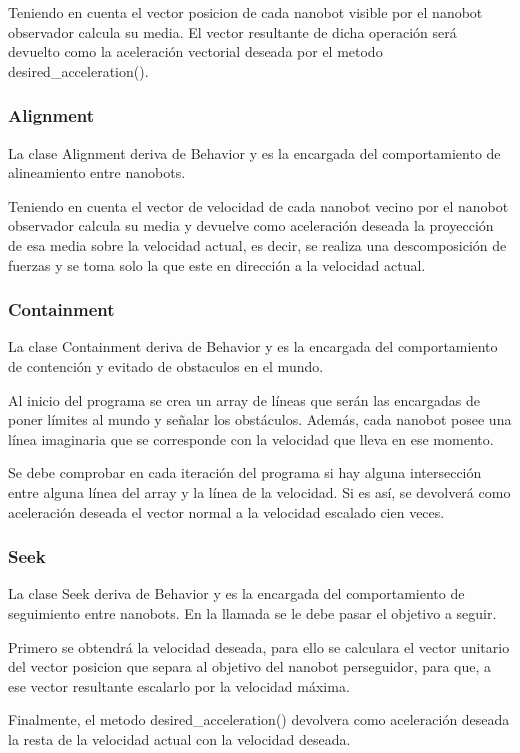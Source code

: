 Teniendo en cuenta el vector posicion de cada nanobot visible por el nanobot observador calcula su media. El vector resultante de dicha operación será devuelto como la aceleración vectorial deseada por el metodo desired\_acceleration().

\subsubsection{Alignment}
\label{sec:alignment}
La clase Alignment deriva de Behavior y es la encargada del comportamiento de alineamiento entre nanobots.

Teniendo en cuenta el vector de velocidad de cada nanobot vecino por el nanobot observador calcula su media y devuelve como aceleración deseada la proyección de esa media sobre la velocidad actual, es decir, se realiza una descomposición de fuerzas y se toma solo la que este en dirección a la velocidad actual.

\subsubsection{Containment}
\label{sec:containment}
La clase Containment deriva de Behavior y es la encargada del comportamiento de contención y evitado de obstaculos en el mundo.

Al inicio del programa se crea un array de líneas que serán las encargadas de poner límites al mundo y señalar los obstáculos. Además, cada nanobot posee una línea imaginaria que se corresponde con la velocidad que lleva en ese momento.

Se debe comprobar en cada iteración del programa si hay alguna intersección entre alguna línea del array y la línea de la velocidad. Si es así, se devolverá como aceleración deseada el vector normal a la velocidad escalado cien veces.

\subsubsection{Seek}
\label{sec:seek}
La clase Seek deriva de Behavior y es la encargada del comportamiento de seguimiento entre nanobots. En la llamada se le debe pasar el objetivo a seguir. 

Primero se obtendrá la velocidad deseada, para ello se calculara el vector unitario del vector posicion que separa al objetivo del nanobot perseguidor, para que, a ese vector resultante escalarlo por la  velocidad máxima.

Finalmente, el metodo desired\_acceleration() devolvera como aceleración deseada la resta de la velocidad actual con la velocidad deseada.


